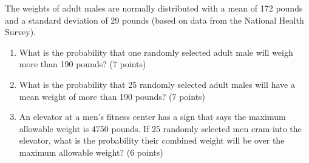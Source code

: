 

\item The weights of adult males are normally distributed with a mean of 172 
pounds and a standard deviation of 29 pounds (based on data from the National
Health Survey). 

\begin{enumerate}
\item What is the probability that one randomly selected adult male will weigh 
more than 190 pounds? (7 points)

\vfill
\vfill

\item What is the probability that 25 randomly selected adult males will have a 
mean weight of more than 190 pounds? (7 points)


\vfill
\vfill
\vfill

\item An elevator at a men's fitness center has a sign that says the maximum 
allowable weight is 4750 pounds. If 25 randomly selected men cram into the 
elevator, what is the probability their combined weight will be over the maximum allowable weight? 
(6 points)


\vfill
\vfill

\end{enumerate}